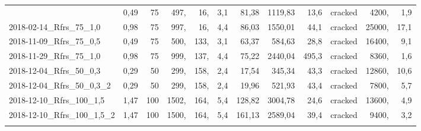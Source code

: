 \begin{tabular}{lrrrrrrrrlrr}
{     2018-02-14\_Rfrs\_75\_0,5 &            0,49 &              75 &            497, &               16, &                                     3,1 &           81,38 &                                  1119,83 &           13,6 &        cracked &             4200, &                      1,9 \\
     2018-02-14\_Rfrs\_75\_1,0 &            0,98 &              75 &            997, &               16, &                                     4,4 &           86,03 &                                  1550,01 &           44,1 &        cracked &            25000, &                     17,1 \\
     2018-11-09\_Rfrs\_75\_0,5 &            0,49 &              75 &            500, &              133, &                                     3,1 &           63,37 &                                   584,63 &           28,8 &        cracked &            16400, &                      9,1 \\
     2018-11-29\_Rfrs\_75\_1,0 &            0,98 &              75 &            999, &              137, &                                     4,4 &           75,22 &                                  2440,04 &          495,3 &        cracked &             8360, &                      1,6 \\
     2018-12-04\_Rfrs\_50\_0,3 &            0,29 &              50 &            299, &              158, &                                     2,4 &           17,54 &                                   345,34 &           43,3 &        cracked &            12860, &                     10,6 \\
  2018-12-04\_Rfrs\_50\_0,3\_2 &            0,29 &              50 &            299, &              158, &                                     2,4 &           19,96 &                                   521,93 &           43,4 &        cracked &             7800, &                      5,7 \\
    2018-12-10\_Rfrs\_100\_1,5 &            1,47 &             100 &           1502, &              164, &                                     5,4 &          128,82 &                                  3004,78 &           24,6 &        cracked &            13600, &                      4,9 \\
 2018-12-10\_Rfrs\_100\_1,5\_2 &            1,47 &             100 &           1500, &              164, &                                     5,4 &          161,13 &                                  2589,04 &           39,4 &        cracked &             9400, &                      3,2 \\
}
\end{tabular}
